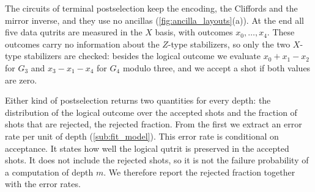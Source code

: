 The circuits of terminal postselection keep the encoding, the Cliffords and the mirror inverse, and they use no ancillas (\autoref{fig:ancilla_layouts}(a)). At the end all five data qutrits are measured in the $X$ basis, with outcomes $x_0, \dots, x_4$. These outcomes carry no information about the $Z$-type stabilizers, so only the two $X$-type stabilizers are checked: besides the logical outcome we evaluate $x_0 + x_1 - x_2$ for $G_3$ and $x_3 - x_1 - x_4$ for $G_4$ modulo three, and we accept a shot if both values are zero.

Either kind of postselection returns two quantities for every depth: the distribution of the logical outcome over the accepted shots and the fraction of shots that are rejected, the rejected fraction. From the first we extract an error rate per unit of depth (\autoref{sub:fit_model}). This error rate is conditional on acceptance. It states how well the logical qutrit is preserved in the accepted shots. It does not include the rejected shots, so it is not the failure probability of a computation of depth $m$. We therefore report the rejected fraction together with the error rates.
